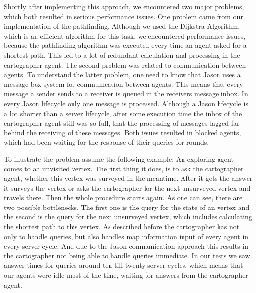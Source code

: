 Shortly after implementing this approach, we encountered two major problems, which both resulted in serious performance issues.
One problem came from our implementation of the pathfinding.
Although we used the Dijkstra-Algorithm, which is an efficient algorithm for this task, we encountered performance issues, because the pathfinding algorithm was executed every time an agent asked for a shortest path.
This led to a lot of redundant calculation and processing in the cartographer agent.
The second problem was related to communication between agents.
To understand the latter problem, one need to know that Jason uses a message box system for communication between agents.
This means that every message a sender sends to a receiver is queued in the receivers message inbox.
In every Jason lifecycle only one message is processed.
Although a Jason lifecycle is a lot shorter than a server lifecycle, after some execution time the inbox of the cartographer agent still was so full, that the processing of messages lagged far behind the receiving of these messages.
Both issues resulted in blocked agents, which had been waiting for the response of their queries for rounds.

To illustrate the problem assume the following example: An exploring agent comes to an unvisited vertex.
The first thing it does, is to ask the cartographer agent, whether this vertex was surveyed in the meantime.
After it gets the answer it surveys the vertex or asks the cartographer for the next unsurveyed vertex and travels there.
Then the whole procedure starts again.
As one can see, there are two possible bottlenecks.
The first one is the query for the state of an vertex and the second is the query for the next unsurveyed vertex, which includes calculating the shortest path to this vertex.
As described before the cartographer has not only to handle queries, but also handles map information input of every agent in every server cycle.
And due to the Jason communication approach this results in the cartographer not being able to handle queries immediate.
In our tests we saw answer times for queries around ten till twenty server cycles, which means that our agents were idle most of the time, waiting for answers from the cartographer agent.

